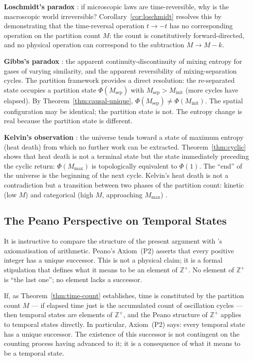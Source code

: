 \documentclass[twocolumn,10pt,a4paper]{article}
\theoremstyle{thmstyle}
\theoremstyle{definition}
\theoremstyle{remark}
\newcommand{\Zp}{\mathbb{Z}^{+}}
\newcommand{\Mmax}{M_{\max}}
\newcommand{\PhiMap}{\varPhi}
\begin{document}
\textbf{Loschmidt's paradox} \citep{loschmidt1876,loschmidt1877}: if microscopic laws are time-reversible, why is the macroscopic world irreversible? Corollary~\ref{cor:loschmidt} resolves this by demonstrating that the time-reversal operation $t \to -t$ has no corresponding operation on the partition count $M$: the count is constitutively forward-directed, and no physical operation can correspond to the subtraction $M \to M - k$.

\textbf{Gibbs's paradox} \citep{gibbs1902}: the apparent continuity-discontinuity of mixing entropy for gases of varying similarity, and the apparent reversibility of mixing-separation cycles. The partition framework provides a direct resolution: the re-separated state occupies a partition state $\PhiMap(M_{\mathrm{sep}})$ with $M_{\mathrm{sep}} > M_{\mathrm{init}}$ (more cycles have elapsed). By Theorem~\ref{thm:causal-unique}, $\PhiMap(M_{\mathrm{sep}}) \neq \PhiMap(M_{\mathrm{init}})$. The spatial configuration may be identical; the partition state is not. The entropy change is real because the partition state is different.

\textbf{Kelvin's observation} \citep{kelvin1852}: the universe tends toward a state of maximum entropy (heat death) from which no further work can be extracted. Theorem~\ref{thm:cyclic} shows that heat death is not a terminal state but the state immediately preceding the cyclic return: $\PhiMap(\Mmax)$ is topologically equivalent to $\PhiMap(1)$. The ``end'' of the universe is the beginning of the next cycle. Kelvin's heat death is not a contradiction but a transition between two phases of the partition count: kinetic (low $M$) and categorical (high $M$, approaching $\Mmax$) \citep{penrose2010}.

\subsection{The Peano Perspective on Temporal States}

It is instructive to compare the structure of the present argument with \citet{peano1889}'s axiomatisation of arithmetic. Peano's Axiom~(P2) asserts that every positive integer has a unique successor. This is not a physical claim; it is a formal stipulation that defines what it means to be an element of $\Zp$. No element of $\Zp$ is ``the last one''; no element lacks a successor.

If, as Theorem~\ref{thm:time-count} establishes, time is constituted by the partition count $M$ --- if elapsed time just is the accumulated count of oscillation cycles --- then temporal states are elements of $\Zp$, and the Peano structure of $\Zp$ applies to temporal states directly. In particular, Axiom~(P2) says: every temporal state has a unique successor. The existence of this successor is not contingent on the counting process having advanced to it; it is a consequence of what it means to be a temporal state.
\end{document}
